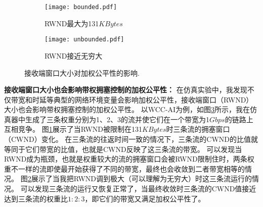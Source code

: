 \documentclass[winfonts]{njuthesis}
\begin{document}
\begin{figure}[ht]
	\begin{subfigure}{.5\textwidth}
    \centering
    \texttt{[image: bounded.pdf]}
    \caption{RWND最大为131$KBytes$}
	\label{fig:BoundedCwnd}
  \end{subfigure}
	\begin{subfigure}{.5\textwidth}
		\centering
    \texttt{[image: unbounded.pdf]}
    \caption{RWND接近无穷大}
	\label{fig:UnbounedCwnd}
  \end{subfigure}
	\caption{接收端窗口大小对加权公平性的影响.}
	\label{fig:EndHostBuffer}
\end{figure}

\textbf{接收端窗口大小也会影响带权拥塞控制的加权公平性：}
在仿真实验中，我发现不仅带宽和时延等典型的网络环境变量会影响加权公平性，接收端窗口（RWND）大小也会影响带权拥塞控制的加权公平性。
以WCC-AI为例，如图\ref{fig:EndHostBuffer}所示，我在仿真器中生成了三条权重分别为1、2、3的流并使它们在一个带宽为1$Gbps$的链路上互相竞争。
图\ref{fig:BoundedCwnd}展示了当RWND被限制在131$KBytes$时三条流的拥塞窗口（CWND）变化。
在三条流的往返时间一致的情况下，三条流的CWND的比值就等同于它们带宽的比值，也就是CWND反映了这三条流的带宽。
可以发现当RWND成为瓶颈，也就是权重较大的流的拥塞窗口会被RWND限制住时，两条权重不一样的流即使最开始获得了不同的带宽，最终也会收敛到二者带宽相等的情况。
图\ref{fig:UnbounedCwnd}展示了当我把RWND调到极大（可以理解为无穷大）时这三条流运行的情况。
可以发现三条流的运行又恢复正常了，当最终收敛时三条流的CWND值接近达到三条流的权重比$1:2:3$，即它们的带宽又满足加权公平性了。
\end{document}

